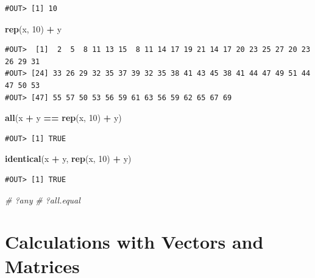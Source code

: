 \documentclass[]{book}
\newenvironment{Shaded}{\begin{snugshade}}{\end{snugshade}}
\newcommand{\KeywordTok}[1]{\textcolor[rgb]{0.13,0.29,0.53}{\textbf{#1}}}
\newcommand{\DecValTok}[1]{\textcolor[rgb]{0.00,0.00,0.81}{#1}}
\newcommand{\StringTok}[1]{\textcolor[rgb]{0.31,0.60,0.02}{#1}}
\newcommand{\CommentTok}[1]{\textcolor[rgb]{0.56,0.35,0.01}{\textit{#1}}}
\newcommand{\OperatorTok}[1]{\textcolor[rgb]{0.81,0.36,0.00}{\textbf{#1}}}
\newcommand{\NormalTok}[1]{#1}
\theoremstyle{definition}
\theoremstyle{definition}
\theoremstyle{definition}
\theoremstyle{remark}
\begin{document}
\begin{verbatim}
#OUT> [1] 10
\end{verbatim}

\begin{Shaded}
\begin{Highlighting}[]
\KeywordTok{rep}\NormalTok{(x, }\DecValTok{10}\NormalTok{) }\OperatorTok{+}\StringTok{ }\NormalTok{y}
\end{Highlighting}
\end{Shaded}

\begin{verbatim}
#OUT>  [1]  2  5  8 11 13 15  8 11 14 17 19 21 14 17 20 23 25 27 20 23 26 29 31
#OUT> [24] 33 26 29 32 35 37 39 32 35 38 41 43 45 38 41 44 47 49 51 44 47 50 53
#OUT> [47] 55 57 50 53 56 59 61 63 56 59 62 65 67 69
\end{verbatim}

\begin{Shaded}
\begin{Highlighting}[]
\KeywordTok{all}\NormalTok{(x }\OperatorTok{+}\StringTok{ }\NormalTok{y }\OperatorTok{==}\StringTok{ }\KeywordTok{rep}\NormalTok{(x, }\DecValTok{10}\NormalTok{) }\OperatorTok{+}\StringTok{ }\NormalTok{y)}
\end{Highlighting}
\end{Shaded}

\begin{verbatim}
#OUT> [1] TRUE
\end{verbatim}

\begin{Shaded}
\begin{Highlighting}[]
\KeywordTok{identical}\NormalTok{(x }\OperatorTok{+}\StringTok{ }\NormalTok{y, }\KeywordTok{rep}\NormalTok{(x, }\DecValTok{10}\NormalTok{) }\OperatorTok{+}\StringTok{ }\NormalTok{y)}
\end{Highlighting}
\end{Shaded}

\begin{verbatim}
#OUT> [1] TRUE
\end{verbatim}

\begin{Shaded}
\begin{Highlighting}[]
\CommentTok{# ?any}
\CommentTok{# ?all.equal}
\end{Highlighting}
\end{Shaded}

\section{Calculations with Vectors and
Matrices}\label{calculations-with-vectors-and-matrices}
\end{document}

